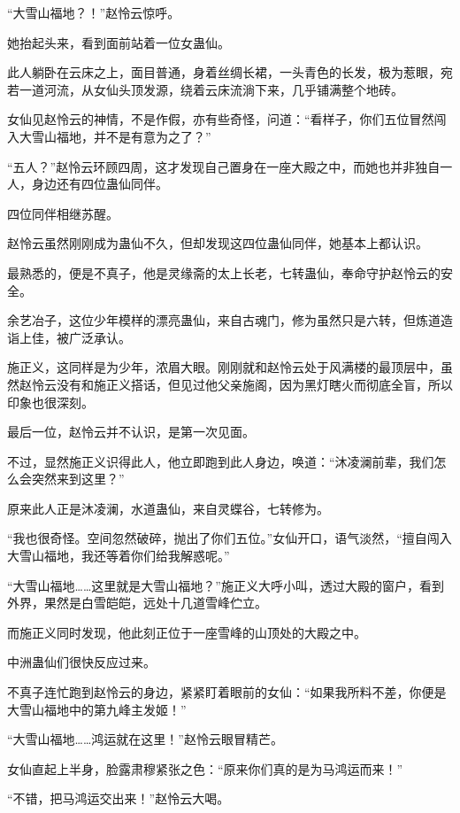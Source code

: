 
\begin{this_body}

“大雪山福地？！”赵怜云惊呼。

她抬起头来，看到面前站着一位女蛊仙。

此人躺卧在云床之上，面目普通，身着丝绸长裙，一头青色的长发，极为惹眼，宛若一道河流，从女仙头顶发源，绕着云床流淌下来，几乎铺满整个地砖。

女仙见赵怜云的神情，不是作假，亦有些奇怪，问道：“看样子，你们五位冒然闯入大雪山福地，并不是有意为之了？”

“五人？”赵怜云环顾四周，这才发现自己置身在一座大殿之中，而她也并非独自一人，身边还有四位蛊仙同伴。

四位同伴相继苏醒。

赵怜云虽然刚刚成为蛊仙不久，但却发现这四位蛊仙同伴，她基本上都认识。

最熟悉的，便是不真子，他是灵缘斋的太上长老，七转蛊仙，奉命守护赵怜云的安全。

余艺冶子，这位少年模样的漂亮蛊仙，来自古魂门，修为虽然只是六转，但炼道造诣上佳，被广泛承认。

施正义，这同样是为少年，浓眉大眼。刚刚就和赵怜云处于风满楼的最顶层中，虽然赵怜云没有和施正义搭话，但见过他父亲施阁，因为黑灯瞎火而彻底全盲，所以印象也很深刻。

最后一位，赵怜云并不认识，是第一次见面。

不过，显然施正义识得此人，他立即跑到此人身边，唤道：“沐凌澜前辈，我们怎么会突然来到这里？”

原来此人正是沐凌澜，水道蛊仙，来自灵蝶谷，七转修为。

“我也很奇怪。空间忽然破碎，抛出了你们五位。”女仙开口，语气淡然，“擅自闯入大雪山福地，我还等着你们给我解惑呢。”

“大雪山福地……这里就是大雪山福地？”施正义大呼小叫，透过大殿的窗户，看到外界，果然是白雪皑皑，远处十几道雪峰伫立。

而施正义同时发现，他此刻正位于一座雪峰的山顶处的大殿之中。

中洲蛊仙们很快反应过来。

不真子连忙跑到赵怜云的身边，紧紧盯着眼前的女仙：“如果我所料不差，你便是大雪山福地中的第九峰主发姬！”

“大雪山福地……鸿运就在这里！”赵怜云眼冒精芒。

女仙直起上半身，脸露肃穆紧张之色：“原来你们真的是为马鸿运而来！”

“不错，把马鸿运交出来！”赵怜云大喝。


\end{this_body}
